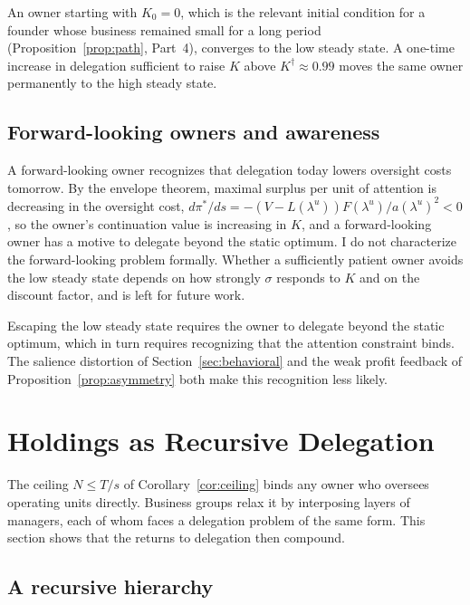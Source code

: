 \documentclass[11pt,a4paper]{article}
\theoremstyle{plain}
\begin{document}
An owner starting with $K_0 = 0$, which is the relevant initial condition for a founder whose business remained small for a long period (Proposition~\ref{prop:path}, Part~4), converges to the low steady state. A one-time increase in delegation sufficient to raise $K$ above $K^\dagger \approx 0.99$ moves the same owner permanently to the high steady state.

\subsection{Forward-looking owners and awareness}

A forward-looking owner recognizes that delegation today lowers oversight costs tomorrow. By the envelope theorem, maximal surplus per unit of attention is decreasing in the oversight cost, $d\pi^*/ds = -(V - L(\lambda^u)) F(\lambda^u) / a(\lambda^u)^2 < 0$, so the owner's continuation value is increasing in $K$, and a forward-looking owner has a motive to delegate beyond the static optimum. I do not characterize the forward-looking problem formally. Whether a sufficiently patient owner avoids the low steady state depends on how strongly $\sigma$ responds to $K$ and on the discount factor, and is left for future work.

Escaping the low steady state requires the owner to delegate beyond the static optimum, which in turn requires recognizing that the attention constraint binds. The salience distortion of Section~\ref{sec:behavioral} and the weak profit feedback of Proposition~\ref{prop:asymmetry} both make this recognition less likely.

\section{Holdings as Recursive Delegation}\label{sec:holdings}

The ceiling $N \le T/s$ of Corollary~\ref{cor:ceiling} binds any owner who oversees operating units directly. Business groups relax it by interposing layers of managers, each of whom faces a delegation problem of the same form. This section shows that the returns to delegation then compound.

\subsection{A recursive hierarchy}
\end{document}
